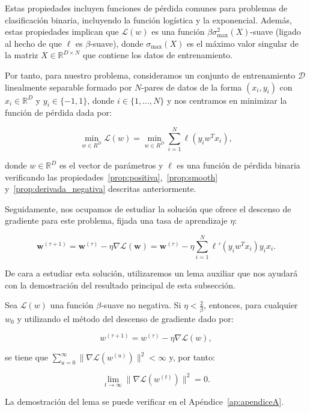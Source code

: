 Estas propiedades incluyen funciones de pérdida comunes para problemas de clasificación binaria, incluyendo la función logística y la exponencial. Además, estas propiedades implican que $\mathcal{L}(w)$ es una función $\beta \sigma^{2}_{\max}(X)$-suave (ligado al hecho de que $\ell$ es $\beta$-suave), donde $\sigma_{\max}(X)$ es el máximo valor singular de la matriz $X \in \mathbb{R}^{D \times N}$ que contiene los datos de entrenamiento.

Por tanto, para nuestro problema, consideramos un conjunto de entrenamiento $\mathcal{D}$ linealmente separable formado por $N$-pares de datos de la forma $(x_i, y_i)$ con $x_i \in \mathbb{R}^{D}$ y $y_i \in \{ -1, 1\}$, donde $i \in \{1, \ldots, N \}$ y nos centramos en minimizar la función de pérdida dada por:

\[
    \min_{w \in R^{D}}\mathcal{L}(w) = \min_{w \in R^{D}} \sum_{i=1}^{N} \ell(y_i w^{T}x_i),
\]

donde $w \in \mathbb{R}^{D}$ es el vector de parámetros y $\ell$ es una función de pérdida binaria verificando las propiedades~\ref{prop:positiva},~\ref{prop:smooth} y~\ref{prop:derivada_negativa} descritas anteriormente.

Seguidamente, nos ocupamos de estudiar la solución que ofrece el descenso de gradiente para este problema, fijada una tasa de aprendizaje $\eta$:

\[
    \mathbf{w}^{(\tau + 1)} = \mathbf{w}^{(\tau)} - \eta \nabla \mathcal{L}(\mathbf{w}) = \mathbf{w}^{(\tau)} - \eta \sum_{i=1}^{N} \ell'(y_i w^{T}x_i)y_i x_i.
\]

De cara a estudiar esta solución, utilizaremos un lema auxiliar que nos ayudará con la demostración del resultado principal de esta subsección.
\begin{lema}\label{lema:raro-clasificación-gd}
    Sea $\mathcal{L}(w)$ una función $\beta$-suave no negativa. Si $\eta < \frac{2}{\beta}$, entonces, para cualquier $w_0$ y utilizando el método del descenso de gradiente dado por:

    \[
        w^{(\tau + 1)} = w^{(\tau)} - \eta \nabla \mathcal{L}(w),
    \]

    se tiene que $\sum_{u=0}^{\infty} \| \nabla\mathcal{L}(w^{(u)}) \|^{2} < \infty$ y, por tanto:

    \[
        \lim \limits_{t \to \infty} \| \nabla\mathcal{L}(w^{(t)}) \|^{2} = 0.
    \]
\end{lema}

La demostración del lema se puede verificar en el Apéndice~\ref{ap:apendiceA}.

